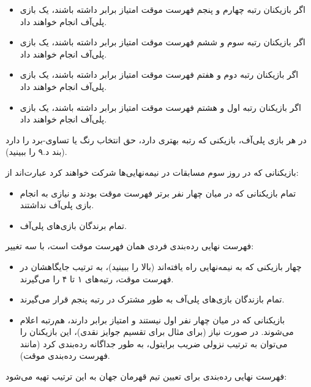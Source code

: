
\begin{itemize}
  \item اگر بازیکنان رتبه چهارم و پنجم فهرست موقت امتیاز برابر داشته باشند، یک بازی پلی‌آف انجام خواهند داد.
  \item اگر بازیکنان رتبه سوم و ششم فهرست موقت امتیاز برابر داشته باشند، یک بازی پلی‌آف انجام خواهند داد.
  \item اگر بازیکنان رتبه دوم و هفتم فهرست موقت امتیاز برابر داشته باشند، یک بازی پلی‌آف انجام خواهند داد.
  \item اگر بازیکنان رتبه اول و هشتم فهرست موقت امتیاز برابر داشته باشند، یک بازی پلی‌آف انجام خواهند داد.
\end{itemize}


در هر بازی پلی‌آف، بازیکنی که رتبه بهتری دارد، حق انتخاب رنگ یا تساوی-برد را دارد (بند د.۹ را ببینید).


بازیکنانی که در روز سوم مسابقات در نیمه‌نهایی‌ها شرکت خواهند کرد عبارت‌اند از:

\begin{itemize}
  \item تمام بازیکنانی که در میان چهار نفر برتر فهرست موقت بودند و نیازی به انجام بازی پلی‌آف نداشتند.
  \item تمام برندگان بازی‌های پلی‌آف.
\end{itemize}

فهرست نهایی رده‌بندی فردی همان فهرست موقت است، با سه تغییر:

\begin{itemize}
  \item چهار بازیکنی که به نیمه‌نهایی راه یافته‌اند (بالا را ببینید)، به ترتیب جایگاهشان در فهرست موقت، رتبه‌های ۱ تا ۴ را می‌گیرند.
  \item تمام بازندگان بازی‌های پلی‌آف به طور مشترک در رتبه پنجم قرار می‌گیرند.
  \item بازیکنانی که در میان چهار نفر اول نیستند و امتیاز برابر دارند، هم‌رتبه اعلام می‌شوند. در صورت نیاز (برای مثال برای تقسیم جوایز نقدی)، این بازیکنان را می‌توان به ترتیب نزولی ضریب برایتول، به طور جداگانه رده‌بندی کرد (مانند فهرست رده‌بندی موقت).
\end{itemize}


فهرست نهایی رده‌بندی برای تعیین تیم قهرمان جهان به این ترتیب تهیه می‌شود:

